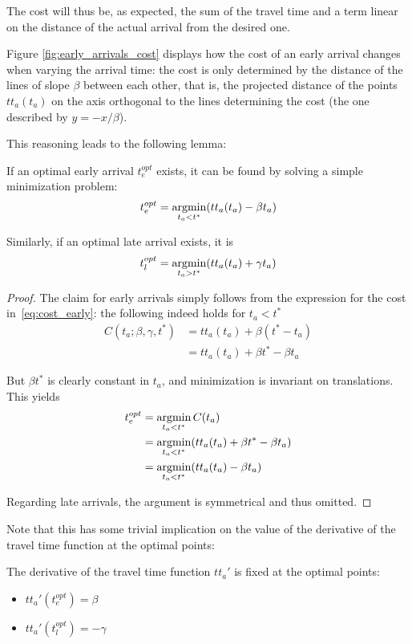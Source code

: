 The cost will thus be, as expected,
the sum of the travel time and a term linear on the distance of the actual arrival from the desired one.

Figure \ref{fig:early_arrivals_cost} displays how the cost of an early arrival changes when varying the arrival time:
the cost is only determined by the distance of the lines of slope \(\beta\) between each other, that is,
the projected distance of the points \(tt_a(t_a)\) on the axis orthogonal to the lines determining the cost
(the one described by \(y = -x/\beta\)).

This reasoning leads to the following lemma:
\begin{lemma}
  \label{lemma:cost_decoupled}
  If an optimal early arrival \(t_e^{opt}\) exists,
  it can be found by solving a simple minimization problem:
  \begin{equation*}
    t_e^{opt} = \operatorname*{argmin}_{t_a < t^*} (tt_a(t_a) - \beta t_a)
  \end{equation*}

  Similarly, if an optimal late arrival exists,
  it is
  \begin{equation*}
    t_l^{opt} = \operatorname*{argmin}_{t_a > t^*} (tt_a(t_a) + \gamma t_a)
  \end{equation*}
\end{lemma}
\begin{proof}
  The claim for early arrivals simply follows from the expression for the cost in~\eqref{eq:cost_early}:
  the following indeed holds for \(t_a < t^*\)
  \begin{align*}
    C(t_a; \beta, \gamma, t^*) & = tt_a(t_a) + \beta(t^*- t_a) \\
                               & = tt_a(t_a) + \beta t^* - \beta t_a
  \end{align*}

  But \(\beta t^*\) is clearly constant in \(t_a\),
  and minimization is invariant on translations.
  This yields
  \begin{align*}
    t_e^{opt} & = \operatorname*{argmin}_{t_a < t^*} C(t_a) \\
              & = \operatorname*{argmin}_{t_a < t^*} (tt_a(t_a) + \beta t^* - \beta t_a) \\
              & = \operatorname*{argmin}_{t_a < t^*} (tt_a(t_a) - \beta t_a)
  \end{align*}

  Regarding late arrivals, the argument is symmetrical and thus omitted.
\end{proof}

Note that this has some trivial implication on the value of the derivative of the travel time function at the optimal points:
\begin{obs}
  \label{obs:foc}
  The derivative of the travel time function \(tt_a'\) is fixed at the optimal points:
  \begin{itemize}
  \item \(tt_a'(t_e^{opt}) = \beta\)
  \item \(tt_a'(t_l^{opt}) = -\gamma\)
  \end{itemize}
\end{obs}

